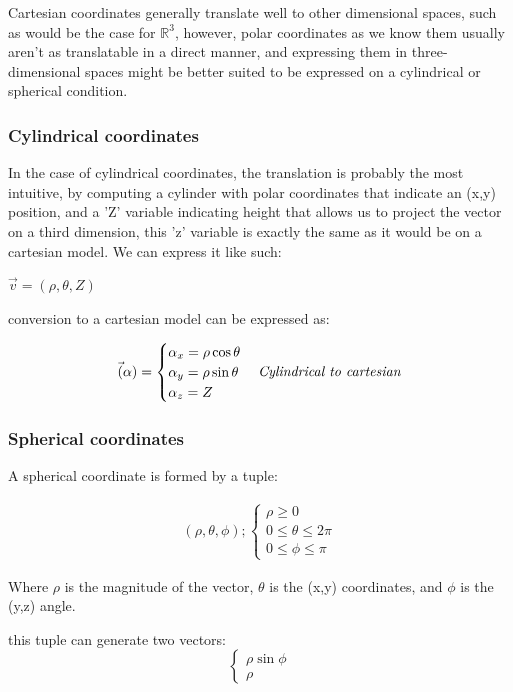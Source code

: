 \documentclass[11pt,fleqn]{book} %
\begin{document}
Cartesian coordinates generally translate well to other dimensional spaces, such as would be the case
for $ \mathbb{R}^3 $, however, polar coordinates as we know them usually aren't as translatable in a direct
manner, and expressing them in three-dimensional spaces might be better suited to 
be expressed on a cylindrical or spherical condition. 
\subsubsection*{Cylindrical coordinates}
In the case of cylindrical coordinates, the translation is probably the most intuitive, by computing
a cylinder with polar coordinates that indicate an (x,y) position, and a 'Z' variable indicating height 
that allows us to project the vector on a third dimension, this 'z' variable is exactly the same as it would be
on a cartesian model. We can express it like such:

$ \vec{v} = ( \rho, \theta, Z) $

conversion to a cartesian model can be expressed as:

\begin{gather}
    \vec(\alpha) =
    \begin{cases}
        \alpha_x = \rho \cos \theta \\
        \alpha_y = \rho \sin \theta \\
        \alpha_z = Z
    \end{cases}
    \text{\textit{Cylindrical to cartesian}}
\end{gather}

\subsubsection*{Spherical coordinates}

A spherical coordinate is formed by a tuple:

\begin{gather}
    (\rho, \theta ,\phi);
    \begin{cases}
        \rho \geq  0 \\
        0 \le \theta \le 2\pi \\
        0 \le \phi \le \pi    
    \end{cases}
\end{gather}

Where $ \rho $ is the magnitude of the vector, $\theta$ is the (x,y) coordinates, and
$\phi$ is the (y,z) angle.

this tuple can generate two vectors:
\begin{equation}
    \begin{cases}
        \rho \sin \phi\\
        \rho
    \end{cases}
\end{equation}
\end{document}
